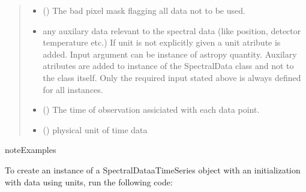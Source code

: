 \documentclass[a4paper,10pt,english]{sphinxmanual}
\begin{document}
\begin{fulllineitems}
\begin{quote}
\begin{description}
\begin{itemize}
\item {} 
 () \textendash{} The bad pixel mask flagging all data not to be used.

\item {} 
 \textendash{} any auxilary data relevant to the spectral data
(like position, detector temperature etc.)
If unit is not explicitly given a unit atribute is added.
Input argument can be instance of astropy quantity.
Auxilary atributes are added to instance of the SpectralData class
and not to the class itself. Only the required input stated above
is always defined for all instances.

\item {} 
 () \textendash{} The time of observation assiciated with each data point.

\item {} 
 () \textendash{} physical unit of time data

\end{itemize}

\end{description}\end{quote}

\begin{sphinxadmonition}{note}{Examples}

To create an instance of a SpectralDataaTimeSeries object with an
initialization with data using units, run the following code:

%
\begin{sphinxVerbatim}[commandchars=\\\{\}]
   
   
\end{sphinxVerbatim}


\end{sphinxadmonition}
\end{fulllineitems}
\end{document}
